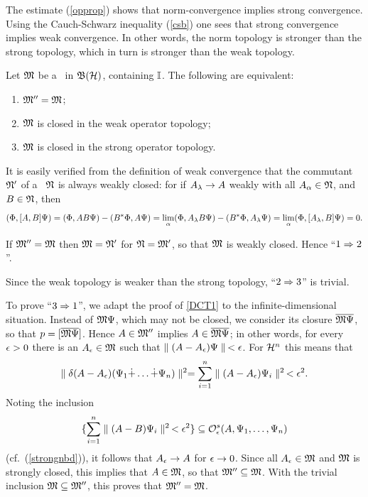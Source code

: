 The estimate (\ref{opprop}) shows that norm-convergence implies strong
convergence.  Using the Cauch-Schwarz inequality (\ref{csb}) one sees
that strong convergence implies weak convergence.  In other words, the
norm topology is stronger than the strong topology, which in turn is
stronger than the weak topology.
\begin{Theorem}
Let ${\frak M}$ be a \sta\ in ${\frak B}({\cal H})$, containing ${\Bbb I}$. The following are
equivalent:
\begin{enumerate}
\item
${\frak M}''={\frak M}$;
\item
${\frak M}$ is closed in the weak operator topology;
\item
${\frak M}$ is closed in the strong operator topology.
\end{enumerate}
\end{Theorem}

It is easily verified from the definition of weak convergence that the
commutant ${\frak N}'$ of a \sta\ ${\frak N}$ is always weakly closed: for if
$A_{\lambda}\rightarrow A$ weakly with all $A_{\alpha}\in{\frak N}$, and $B\in{\frak N}$, then
$$
(\Phi,[A,B]\Psi)=(\Phi,AB\Psi)-(B^*\Phi,A\Psi)= \lim_{\alpha}
(\Phi,A_{\lambda}B\Psi)-(B^*\Phi,A_{\lambda}\Psi)=\lim_{\alpha}(\Phi,[A_{\lambda},B]\Psi)=0.
$$

If ${\frak M}''={\frak M}$ then ${\frak M}={\frak N}'$ for ${\frak N}={\frak M}'$, so that ${\frak M}$ is weakly
closed. Hence ``$1\Rightarrow 2$''.

Since the weak topology is weaker than the strong topology, ``$2\Rightarrow
3$'' is trivial.

To prove ``$3\Rightarrow 1$'', we adapt the proof of \ref{DCT1} to the
infinite-dimensional situation.  Instead of ${\frak M}\Psi$, which may not be
closed, we consider its closure $\overline{{\frak M}\Psi}$, so that
$p=[\overline{{\frak M}\Psi}]$. Hence $A\in{\frak M}''$ implies $A\in\overline{{\frak M}\Psi}$; in
other words, for every $\epsilon>0$ there is an $A_{\epsilon}\in{\frak M}$ such that
$\parallel (A-A_{\epsilon})\Psi\parallel\,<\epsilon$.  For ${\cal H}^n$ this means that
$$
\parallel\delta(A-A_{\epsilon})(\Psi_1\dot{+}\ldots\dot{+}\Psi_n)\parallel^2=\sum_{i=1}^n \parallel
(A-A_{\epsilon})\Psi_i\parallel^2\,<\epsilon^2.
$$
Noting the inclusion
$$
\{\sum_{i=1}^n \parallel (A-B)\Psi_i\parallel^2\,<\epsilon^2\}\subseteq
{\cal O}^s_{\epsilon}(A,\Psi_1,\ldots,\Psi_n)
$$
(cf.\ (\ref{strongnbd})), it follows that $A_{\epsilon}\rightarrow A$ for $\epsilon\rightarrow
0$. Since all $A_{\epsilon}\in{\frak M}$ and ${\frak M}$ is strongly closed, this implies
that $A\in{\frak M}$, so that ${\frak M}''\subseteq{\frak M}$.  With the trivial inclusion
${\frak M}\subseteq{\frak M}''$, this proves that ${\frak M}''={\frak M}$.  \enp
